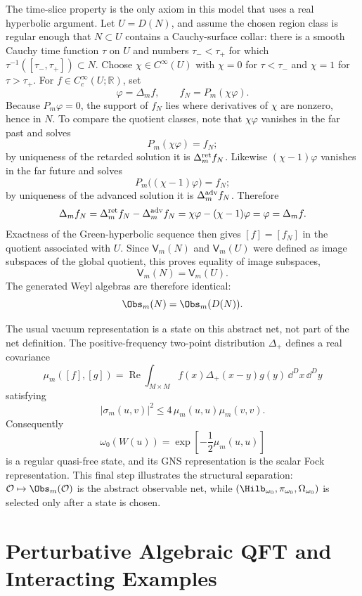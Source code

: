 The time-slice property is the only axiom in this model that uses a real
hyperbolic argument.  Let \(U=D(N)\), and assume the chosen region class is
regular enough that \(N\subset U\) contains a Cauchy-surface collar: there is
a smooth Cauchy time function \(\tau\) on \(U\) and numbers
\(\tau_-<\tau_+\) for which
\(\tau^{-1}([\tau_-,\tau_+])\subset N\).  Choose
\(\chi\in C^\infty(U)\) with \(\chi=0\) for \(\tau<\tau_-\) and
\(\chi=1\) for \(\tau>\tau_+\).  For \(f\in C_c^\infty(U;\mathbb R)\), set
\[
  \varphi=\Delta_m f,\qquad
  f_N=P_m(\chi\varphi).
\]
Because \(P_m\varphi=0\), the support of \(f_N\) lies where derivatives of
\(\chi\) are nonzero, hence in \(N\).  To compare the quotient classes, note
that \(\chi\varphi\) vanishes in the far past and solves
\[
  P_m(\chi\varphi)=f_N;
\]
by uniqueness of the retarded solution it is \(\Delta_m^{\rm ret}f_N\).
Likewise \((\chi-1)\varphi\) vanishes in the far future and solves
\[
  P_m\bigl((\chi-1)\varphi\bigr)=f_N;
\]
by uniqueness of the advanced solution it is \(\Delta_m^{\rm adv}f_N\).
Therefore
\[
  \Delta_m f_N
  =
  \Delta_m^{\rm ret}f_N-\Delta_m^{\rm adv}f_N
  =
  \chi\varphi-(\chi-1)\varphi
  =
  \varphi
  =
  \Delta_m f .
\]
Exactness of the Green-hyperbolic sequence then gives
\([f]=[f_N]\) in the quotient associated with \(U\).  Since
\(\mathsf V_m(N)\) and \(\mathsf V_m(U)\) were defined as image subspaces of
the global quotient, this proves equality of image subspaces,
\[
  \mathsf V_m(N)=\mathsf V_m(U).
\]
The generated Weyl algebras are
therefore identical:
\[
  \Obs_m(N)=\Obs_m(D(N)).
\]

The usual vacuum representation is a state on this abstract net, not part of
the net definition.  The positive-frequency two-point distribution
\(\Delta_+\) defines a real covariance
\[
  \mu_m([f],[g])=\operatorname{Re}
  \int_{M\times M}f(x)\Delta_+(x-y)g(y)\,\dd^D x\,\dd^D y
\]
satisfying
\[
  |\sigma_m(u,v)|^2\le 4\,\mu_m(u,u)\mu_m(v,v).
\]
Consequently
\[
  \omega_0(W(u))=\exp\!\left[-\frac12\mu_m(u,u)\right]
\]
is a regular quasi-free state, and its GNS representation is the scalar Fock
representation.  This final step illustrates the structural separation:
\(\mathcal O\mapsto\Obs_m(\mathcal O)\) is the abstract observable net, while
\((\Hilb_{\omega_0},\pi_{\omega_0},\Omega_{\omega_0})\) is selected only
after a state is chosen.

\section{Perturbative Algebraic QFT and Interacting Examples}
\label{sec:perturbative-aqft-bridge}

